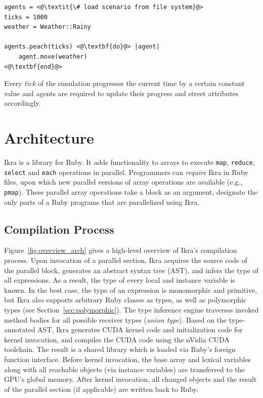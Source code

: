 \documentclass[preprint]{sigplanconf}
\begin{document}
\begin{lstlisting}
agents = <@\textit{\# load scenario from file system}@>
ticks = 1000
weather = Weather::Rainy

agents.peach(ticks) <@\textbf{do}@> |agent|
    agent.move(weather)
<@\textbf{end}@>
\end{lstlisting}

Every \emph{tick} of the simulation progresses the current time by a certain constant value and agents are required to update their progress and street attributes accordingly.

\section{Architecture}
Ikra is a library for Ruby. It adds functionality to arrays to execute \texttt{map}, \texttt{reduce}, \texttt{select} and \texttt{each} operations in parallel. Programmers can \emph{require} Ikra in Ruby files, upon which new parallel versions of array operations are available (e.g., \texttt{pmap}). These parallel array operations take a block as an argument, designate the only parts of a Ruby programs that are parallelized using Ikra.

\subsection{Compilation Process}
Figure~\ref{fig:overview_arch} gives a high-level overview of Ikra's compilation process. Upon invocation of a parallel section, Ikra acquires the source code of the parallel block, generates an abstract syntax tree (AST), and infers the type of all expressions. As a result, the type of every local and instance variable is known. In the best case, the type of an expression is monomorphic and primitive, but Ikra also supports arbitrary Ruby classes as types, as well as polymorphic types (see Section~\ref{sec:polymorphic}). The type inference engine traverses invoked method bodies for all possible receiver types (\emph{union type}). Based on the type-annotated AST, Ikra generates CUDA kernel code and initialization code for kernel invocation, and compiles the CUDA code using the nVidia CUDA toolchain. The result is a shared library which is loaded via Ruby's foreign function interface. Before kernel invocation, the base array and lexical variables along with all reachable objects (via instance variables) are transferred to the GPU's global memory. After kernel invocation, all changed objects and the result of the parallel section (if applicable) are written back to Ruby.
\end{document}
